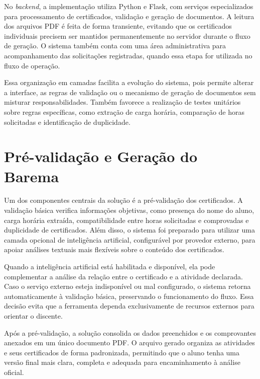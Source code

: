 No \textit{backend}, a implementação utiliza Python\texttrademark{} e Flask\texttrademark{}, com serviços especializados para processamento de certificados, validação e geração de documentos. A leitura dos arquivos PDF é feita de forma transiente, evitando que os certificados individuais precisem ser mantidos permanentemente no servidor durante o fluxo de geração. O sistema também conta com uma área administrativa para acompanhamento das solicitações registradas, quando essa etapa for utilizada no fluxo de operação.

Essa organização em camadas facilita a evolução do sistema, pois permite alterar a interface, as regras de validação ou o mecanismo de geração de documentos sem misturar responsabilidades. Também favorece a realização de testes unitários sobre regras específicas, como extração de carga horária, comparação de horas solicitadas e identificação de duplicidade.

\section{Pré-validação e Geração do Barema}

Um dos componentes centrais da solução é a pré-validação dos certificados. A validação básica verifica informações objetivas, como presença do nome do aluno, carga horária extraída, compatibilidade entre horas solicitadas e comprovadas e duplicidade de certificados. Além disso, o sistema foi preparado para utilizar uma camada opcional de inteligência artificial, configurável por provedor externo, para apoiar análises textuais mais flexíveis sobre o conteúdo dos certificados.

Quando a inteligência artificial está habilitada e disponível, ela pode complementar a análise da relação entre o certificado e a atividade declarada. Caso o serviço externo esteja indisponível ou mal configurado, o sistema retorna automaticamente à validação básica, preservando o funcionamento do fluxo. Essa decisão evita que a ferramenta dependa exclusivamente de recursos externos para orientar o discente.

Após a pré-validação, a solução consolida os dados preenchidos e os comprovantes anexados em um único documento PDF. O arquivo gerado organiza as atividades e seus certificados de forma padronizada, permitindo que o aluno tenha uma versão final mais clara, completa e adequada para encaminhamento à análise oficial.
